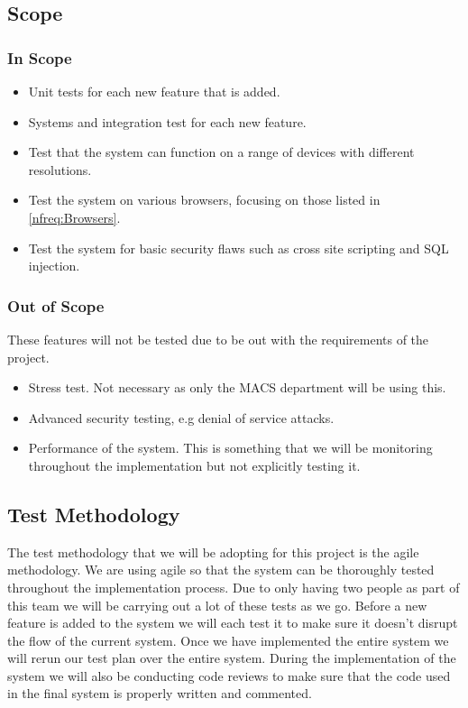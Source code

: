 \documentclass[11pt, a4paper]{article}
\begin{document}
\subsection{Scope}
\subsubsection{In Scope}

\begin{itemize}
    \item Unit tests for each new feature that is added.
    \item Systems and integration test for each new feature.
    \item Test that the system can function on a range of devices with different resolutions.
    \item Test the system on various browsers, focusing on those listed in \autoref{nfreq:Browsers}.
    \item Test the system for basic security flaws such as cross site scripting and SQL injection.
\end{itemize}

\subsubsection{Out of Scope}
These features will not be tested due to be out with the requirements of the project.


\begin{itemize}
  \item Stress test. Not necessary as only the MACS department will be using this.
  \item Advanced security testing, e.g denial of service attacks.
  \item Performance of the system. This is something that we will be monitoring throughout the implementation but not explicitly testing it.
\end{itemize}

\subsection{Test Methodology}
The test methodology that we will be adopting for this project is the agile methodology. We are using agile so that the system can be thoroughly tested throughout the implementation process. Due to only having two people as part of this team we will be carrying out a lot of these tests as we go. Before a new feature is added to the system we will each test it to make sure it doesn't disrupt the flow of the current system. Once we have implemented the entire system we will rerun our test plan over the entire system. During the implementation of the system we will also be conducting code reviews to make sure that the code used in the final system is properly written and commented.
\end{document}

